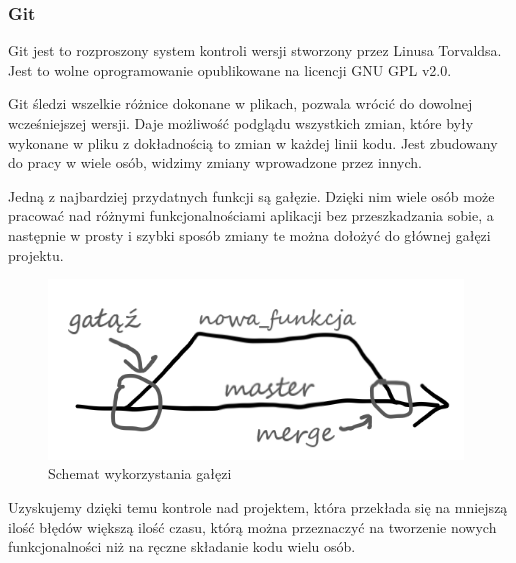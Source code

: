 \documentclass[a4paper,12pt, twoside]{article}
\begin{document}
	\subsubsection{Git}
	\vspace{.5cm}
	Git jest to rozproszony system kontroli wersji stworzony przez Linusa Torvaldsa. Jest to wolne oprogramowanie opublikowane na licencji GNU GPL v2.0.
	
	Git śledzi wszelkie różnice dokonane w plikach, pozwala wrócić do dowolnej wcześniejszej wersji. Daje możliwość podglądu wszystkich zmian, które były wykonane w pliku z dokładnością to zmian w każdej linii kodu. Jest zbudowany do pracy w wiele osób, widzimy zmiany wprowadzone przez innych.
	
	Jedną z najbardziej przydatnych funkcji są gałęzie. Dzięki nim wiele osób może pracować nad różnymi funkcjonalnościami aplikacji bez przeszkadzania sobie, a następnie w prosty i szybki sposób zmiany te można dołożyć do głównej gałęzi projektu.
		\begin{figure}[H]
			\centering
			\vspace{.5cm}
			\includegraphics[width=11cm]{images/rys1_branches.png}
			\vspace{.5cm}
			\caption{Schemat wykorzystania gałęzi}
            \label{fig:branching}
		\end{figure}

	Uzyskujemy dzięki temu kontrole nad projektem, która przekłada się na mniejszą ilość błędów większą ilość czasu, którą można przeznaczyć na tworzenie nowych funkcjonalności niż na ręczne składanie kodu wielu osób.\cite{git}
	
	\newpage
\end{document}
